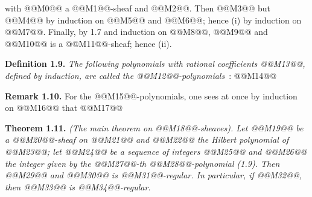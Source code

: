 with @@M0@@ a @@M1@@-sheaf and @@M2@@. Then
@@M3@@
but
@@M4@@
by induction on @@M5@@ and @@M6@@; hence (i) by induction on @@M7@@. Finally, by 1.7 and induction on @@M8@@, @@M9@@ and @@M10@@ is a @@M11@@-sheaf; hence (ii).

\textbf{Definition 1.9.} \emph{The following polynomials with rational coefficients @@M13@@, defined by induction, are called the \emph{@@M12@@-polynomials}}~:
@@M14@@

\textbf{Remark 1.10.} For the @@M15@@-polynomials, one sees at once by induction on @@M16@@ that
@@M17@@

\textbf{Theorem 1.11.} \emph{(The main theorem on @@M18@@-sheaves). Let @@M19@@ be a @@M20@@-sheaf on @@M21@@ and @@M22@@ the Hilbert polynomial of @@M23@@; let @@M24@@ be a sequence of integers @@M25@@ and @@M26@@ the integer given by the @@M27@@-th @@M28@@-polynomial (1.9). Then @@M29@@ and @@M30@@ is @@M31@@-regular. In particular, if @@M32@@, then @@M33@@ is @@M34@@-regular.}

